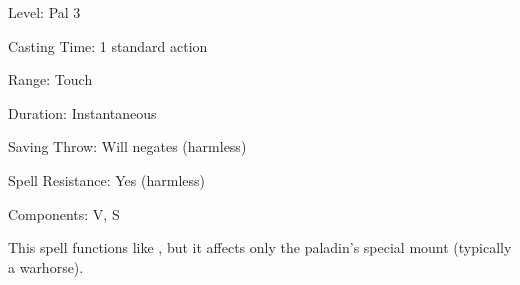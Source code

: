 
\begin{description*}
\item[Level:] Pal 3
\item[Casting Time:] 1 standard action
\item[Range:] Touch
\item[Duration:] Instantaneous
\item[Saving Throw:] Will negates (harmless)
\item[Spell Resistance:] Yes (harmless)
\item[Components:] V, S
\end{description*}

This spell functions like , but it affects only the paladin's special
mount (typically a warhorse).